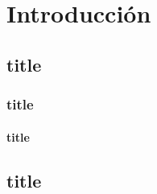 \chapter{Introducción}
\section{title}
\subsection{title} %
\subsubsection{title} %
\section*{title} %